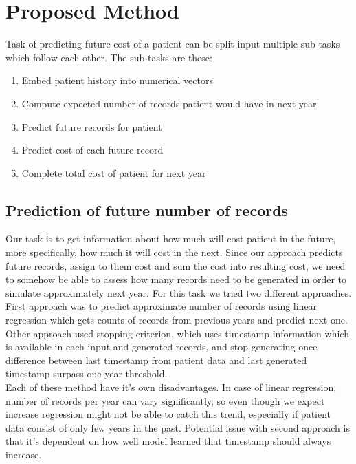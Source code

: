 
\chapter{Proposed Method}

Task of predicting future cost of a patient can be split input multiple sub-tasks which follow each other. The sub-tasks are these:

\begin{enumerate}
	\item Embed patient history into numerical vectors
	\item Compute expected number of records patient would have in next year
	\item Predict future records for patient
	\item Predict cost of each future record
	\item Complete total cost of patient for next year
\end{enumerate}




\section{Prediction of future number of records}

Our task is to get information about how much will cost patient in the future, more specifically, how much it will cost in the next. Since our approach predicts future records, assign to them cost and sum the cost into resulting cost, we need to somehow be able to assess how many records need to be generated in order to simulate approximately next year. For this task we tried two different approaches.
\\

First approach was to predict approximate number of records using linear regression which gets counts of records from previous years and predict next one. Other approach used stopping criterion, which uses timestamp information which is available in each input and generated records, and stop generating once difference between last timestamp from patient data and last generated timestamp surpass one year threshold.
\\

Each of these method have it's own disadvantages. In case of linear regression, number of records per year can vary significantly, so even though we expect increase \cite{num_of_vis} regression might not be able to catch this trend, especially if patient data consist of only few years in the past. Potential issue with second approach is that it's dependent on how well model learned that timestamp should always increase.  




